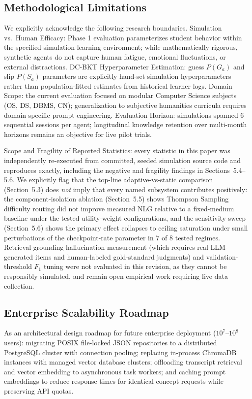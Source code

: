 \documentclass[notitlepage,12pt]{jedm}
\begin{document}
\subsection{Methodological Limitations}
We explicitly acknowledge the following research boundaries. Simulation vs.\ Human Efficacy: Phase 1 evaluation parameterizes student behavior within the specified simulation learning environment; while mathematically rigorous, synthetic agents do not capture human fatigue, emotional fluctuations, or external distractions. DC-BKT Hyperparameter Estimation: guess $P(G_a)$ and slip $P(S_a)$ parameters are explicitly hand-set simulation hyperparameters rather than population-fitted estimates from historical learner logs. Domain Scope: the current evaluation focused on modular Computer Science subjects (OS, DS, DBMS, CN); generalization to subjective humanities curricula requires domain-specific prompt engineering. Evaluation Horizon: simulations spanned 6 sequential sessions per agent; longitudinal knowledge retention over multi-month horizons remains an objective for live pilot trials.

Scope and Fragility of Reported Statistics: every statistic in this paper was independently re-executed from committed, seeded simulation source code and reproduces exactly, including the negative and fragility findings in Sections~5.4--5.6. We explicitly flag that the top-line adaptive-vs-static comparison (Section~5.3) does \emph{not} imply that every named subsystem contributes positively: the component-isolation ablation (Section~5.5) shows Thompson Sampling difficulty routing did not improve measured NLG relative to a fixed-medium baseline under the tested utility-weight configurations, and the sensitivity sweep (Section~5.6) shows the primary effect collapses to ceiling saturation under small perturbations of the checkpoint-rate parameter in 7 of 8 tested regimes. Retrieval-grounding hallucination measurement (which requires real LLM-generated items and human-labeled gold-standard judgments) and validation-threshold $F_1$ tuning were not evaluated in this revision, as they cannot be responsibly simulated, and remain open empirical work requiring live data collection.

\subsection{Enterprise Scalability Roadmap}
As an architectural design roadmap for future enterprise deployment ($10^7$--$10^8$ users): migrating POSIX file-locked JSON repositories to a distributed PostgreSQL cluster with connection pooling; replacing in-process ChromaDB instances with managed vector database clusters; offloading transcript retrieval and vector embedding to asynchronous task workers; and caching prompt embeddings to reduce response times for identical concept requests while preserving API quotas.
\end{document}
